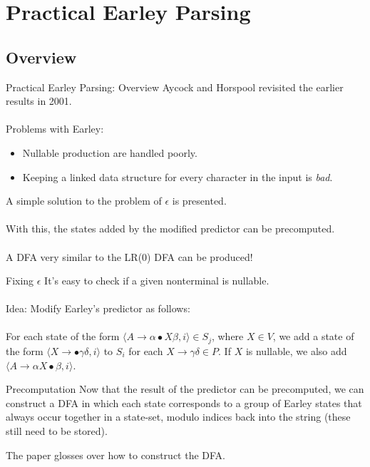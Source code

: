 \documentclass{beamer}
\begin{document}
\section{Practical Earley Parsing}
\subsection{Overview}
\begin{frame}{Practical Earley Parsing: Overview}
  Aycock and Horspool revisited the earlier results in 2001.\\~\\

  Problems with Earley:

  \begin{itemize}
    \item Nullable production are handled poorly.
    \item Keeping a linked data structure for every character in the input is {\it bad}.
  \end{itemize}

  A simple solution to the problem of $\epsilon$ is presented.\\~\\

  With this, the states added by the modified predictor can be precomputed.\\~\\

  A DFA very similar to the LR(0) DFA can be produced!
\end{frame}

\begin{frame}{Fixing $\epsilon$}
  It's easy to check if a given nonterminal is nullable.\\~\\

  Idea: Modify Earley's predictor as follows:\\~\\

  For each state of the form $\langle A \to \alpha \bullet X \beta, i\rangle \in S_j$, where $X \in V$, we add a state of the form
  $\langle X \to \bullet \gamma\delta, i\rangle$ to $S_i$ for each $X \to \gamma\delta \in P$. If $X$ is nullable, we also add
  $\langle A \to \alpha X \bullet \beta, i\rangle$.
\end{frame}

\begin{frame}{Precomputation}
  Now that the result of the predictor can be precomputed, we can construct a DFA in which each state corresponds to
  a group of Earley states that always occur together in a state-set, modulo indices back into the string (these still need to be stored).

  The paper glosses over how to construct the DFA.
\end{frame}
\end{document}
